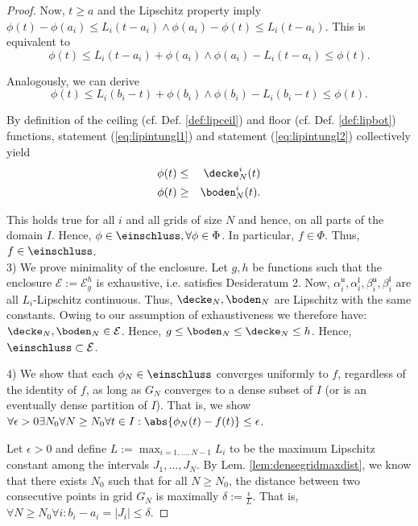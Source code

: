 \begin{thm}
\begin{proof}
Now, $t\geq a$ and the Lipschitz property imply $\phi(t) - \phi(a_i)
\leq L_{i} (t-a_i) \wedge  \phi(a_i) -\phi(t) \leq L_{i} (t-a_i)$.
This is equivalent to
\begin{equation} \label{eq:lipintungl1}
\phi(t)  \leq  L_{i} (t-a_i) + \phi(a_i) \wedge  \phi(a_i) - L_{i}
(t-a_i) \leq \phi(t).
\end{equation}

Analogously, we can derive
\begin{equation}\label{eq:lipintungl2}
\phi(t)  \leq  L_{i} (b_i-t) + \phi(b_i) \wedge  \phi(b_i) - L_{i}
(b_i -t) \leq \phi(t) .
\end{equation}

By definition of the ceiling (cf. Def. \ref{def:lipceil}) and floor
(cf. Def. \ref{def:lipbot}) functions, statement
(\ref{eq:lipintungl1}) and statement (\ref{eq:lipintungl2})
collectively yield
%
\begin{eqnarray}
  \phi(t) &\leq& \decke_N^i (t)   \\
  \phi(t) &\geq& \boden_N^i (t).
\end{eqnarray}

This holds true for all $i$ and all grids of size $N$ and hence, on
all parts of the domain $I$. 
Hence, $ \phi \in \einschluss, \forall
\phi \in \Phi$. In particular, $f \in \Phi$. Thus, $f \in \einschluss$.\\

3) We prove minimality of the enclosure. Let $g,h$ be functions such that the enclosure $\mathcal E := \mathcal E_g^h$ is exhaustive, i.e. satisfies Desideratum 2. Now, $\alpha_i^{\mathfrak u},\alpha_i^{\mathfrak l},\beta_i^{\mathfrak u},\beta_i^{\mathfrak l}$ are all $L_i$-Lipschitz continuous. Thus, $\decke_N,\boden_N$ are Lipschitz with the same constants. Owing to our assumption of exhaustiveness we therefore have: $\decke_N,\boden_N \in \mathcal E$. Hence, $g \leq \boden_N \leq \decke_N \leq h$. Hence, $\einschluss \subset \mathcal E$.

4) We show that each $\phi_N \in \einschluss$ converges uniformly to $f$, regardless of the identity of $f$, as long as $G_N$ converges to a dense subset of $I$ (or is an eventually dense partition of $I$). That is, we show $\forall \epsilon >0 \exists N_0 \forall N \geq N_0 \forall t \in I : \abs{\phi_N(t) - f(t)} \leq \epsilon$.

Let $\epsilon > 0$ and define $L := \max_{i=1,...,N-1} L_i$ to be the maximum Lipschitz constant among the intervals $J_1,...,J_N$. By Lem. \ref{lem:densegridmaxdist}, we know that there exists $N_0$ such that for all $N \geq N_0$, the distance between two consecutive points in grid $G_N$ is maximally $\delta:=\frac{\epsilon}{L}$. That is,
$\forall N \geq N_0 \forall i: b_i - a_i = |J_i| \leq \delta$. 


\end{proof}
\end{thm}
